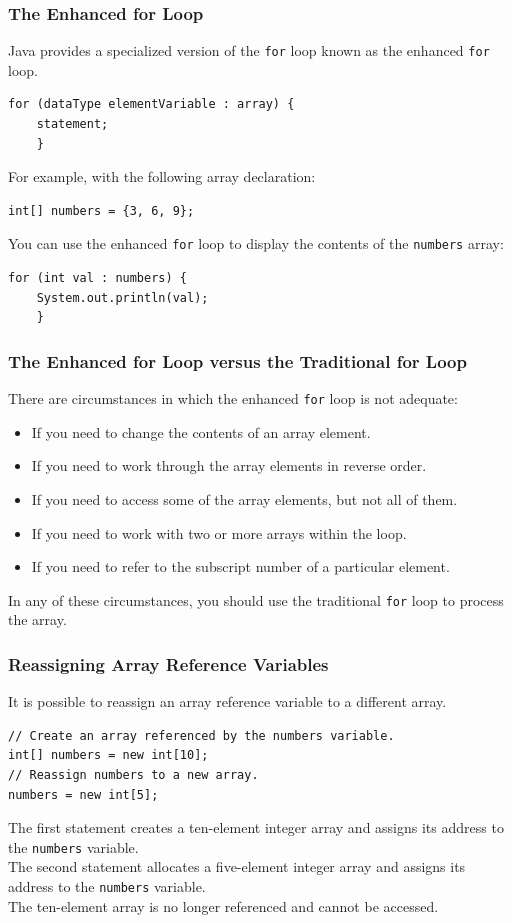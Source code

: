 \documentclass[11pt]{beamer}
\begin{document}
\begin{frame}[fragile]
    \frametitle{The Enhanced for Loop}
    Java provides a specialized version of the \texttt{for} loop known as the enhanced \texttt{for} loop.
    \begin{lstlisting}[basicstyle=\ttfamily\footnotesize]
for (dataType elementVariable : array) {
    statement;
    }
    \end{lstlisting}
    For example, with the following array declaration:
    \begin{lstlisting}[basicstyle=\ttfamily\footnotesize]
int[] numbers = {3, 6, 9};
    \end{lstlisting}
    You can use the enhanced \texttt{for} loop to display the contents of the \texttt{numbers} array:
    \begin{lstlisting}[basicstyle=\ttfamily\footnotesize]
for (int val : numbers) {
    System.out.println(val);
    }
    \end{lstlisting}
\end{frame}

\begin{frame}[fragile]
    \frametitle{The Enhanced for Loop versus the Traditional for Loop}
    There are circumstances in which the enhanced \texttt{for} loop is not adequate:
    \begin{itemize}
        \item If you need to change the contents of an array element.
        \item If you need to work through the array elements in reverse order.
        \item If you need to access some of the array elements, but not all of them.
        \item If you need to work with two or more arrays within the loop.
        \item If you need to refer to the subscript number of a particular element.
    \end{itemize}
    In any of these circumstances, you should use the traditional \texttt{for} loop to process the array.
\end{frame}

\begin{frame}[fragile]
    \frametitle{Reassigning Array Reference Variables}
    It is possible to reassign an array reference variable to a different array.
    \begin{lstlisting}
// Create an array referenced by the numbers variable.
int[] numbers = new int[10];
// Reassign numbers to a new array.
numbers = new int[5];
    \end{lstlisting}
    The first statement creates a ten-element integer array and assigns its address to the \texttt{numbers} variable. \\ \vspace{1em} 
    The second statement allocates a five-element integer array and assigns its address to the \texttt{numbers} variable. \\ \vspace{1em} 
    The ten-element array is no longer referenced and cannot be accessed.
\end{frame}
\end{document}
